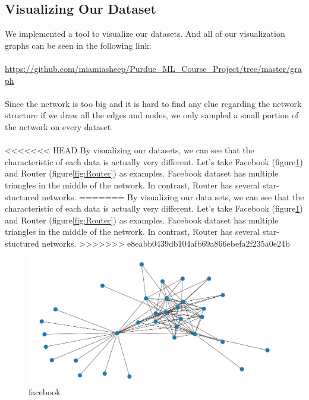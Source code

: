 \documentclass[12pt]{article}
\begin{document}
\subsection{Visualizing Our Dataset}
We implemented a tool to visualize our datasets. And all of our visualization graphs can be seen in the following link:
\\
\\
\url{https://github.com/miamiasheep/Purdue_ML_Course_Project/tree/master/graph}
\\
\\
Since the network is too big and it is hard to find any clue regarding the network structure if we draw all the edges and nodes, we only sampled a small portion of the network on every dataset.
\\
\\
<<<<<<< HEAD
By visualizing our datasets, we can see that the characteristic of each data is actually very different. Let's take Facebook (figure\ref{fig:facebook}) and Router (figure\ref{fig:Router}) as examples. Facebook dataset has multiple triangles in the middle of the network. In contrast, Router has several star-stuctured networks.
=======
By visualizing our data sets, we can see that the characteristic of each data is actually very different. Let's take Facebook (figure\ref{fig:facebook}) and Router (figure\ref{fig:Router}) as examples. Facebook dataset has multiple triangles in the middle of the network. In contrast, Router has several star-stuctured networks.
>>>>>>> e8eabb0439db104afb69a866ebefa2f235a0e24b


\begin{figure}[h]
	\centering
	\includegraphics[scale=0.3]{Facebook}
	\caption{facebook}
	\label{fig:facebook}
\end{figure}
\end{document}
